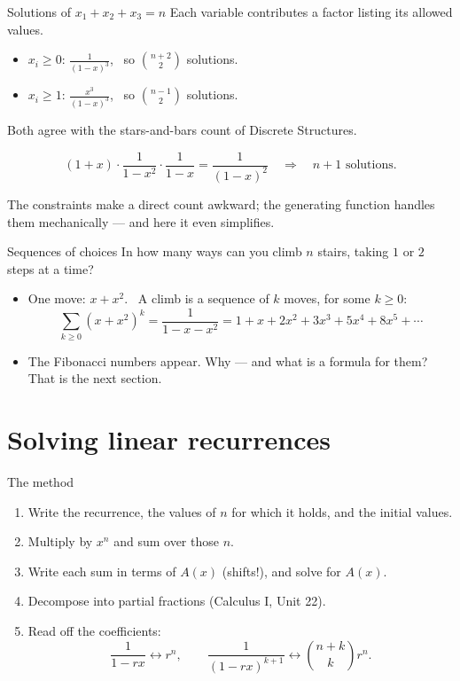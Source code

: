 \documentclass{wosm-slides}
\begin{document}
\begin{frame}{Solutions of $x_1 + x_2 + x_3 = n$}
  Each variable contributes a factor listing its allowed values.
  \begin{itemize}
    \item $x_i \ge 0$: \quad $\frac{1}{(1-x)^3}$, \ so $\binom{n+2}{2}$ solutions.
    \item $x_i \ge 1$: \quad $\frac{x^3}{(1-x)^3}$, \ so $\binom{n-1}{2}$ solutions.
  \end{itemize}
  Both agree with the stars-and-bars count of Discrete Structures.
  \pause
  \begin{example}[$x_1 \in \{0, 1\}$, \ $x_2$ even, \ $x_3 \ge 0$]
    \[ (1 + x) \cdot \frac{1}{1 - x^2} \cdot \frac{1}{1 - x} = \frac{1}{(1-x)^2}
       \quad\Longrightarrow\quad n + 1 \text{ solutions.} \]
  \end{example}
  {\small The constraints make a direct count awkward; the generating function handles them
  mechanically --- and here it even simplifies.\par}
\end{frame}

\begin{frame}{Sequences of choices}
  In how many ways can you climb $n$ stairs, taking $1$ or $2$ steps at a time?
  \pause
  \begin{itemize}
    \item One move: $x + x^2$. \ A climb is a sequence of $k$ moves, for some $k \ge 0$:
      \[ \sum_{k \ge 0} (x + x^2)^k = \frac{1}{1 - x - x^2} = 1 + x + 2x^2 + 3x^3 + 5x^4 + 8x^5 + \cdots \]
    \item The Fibonacci numbers appear. Why --- and what is a formula for them?
      That is the next section.
  \end{itemize}
\end{frame}

\section{Solving linear recurrences}

\begin{frame}{The method}
  \begin{enumerate}
    \item Write the recurrence, the values of $n$ for which it holds, and the initial values.
    \item Multiply by $x^n$ and sum over those $n$.
    \item Write each sum in terms of $A(x)$ (shifts!), and solve for $A(x)$.
    \item Decompose into partial fractions (Calculus I, Unit 22).
    \item Read off the coefficients:
      \[ \frac{1}{1 - rx} \leftrightarrow r^n, \qquad
         \frac{1}{(1 - rx)^{k+1}} \leftrightarrow \binom{n + k}{k} r^n . \]
  \end{enumerate}
\end{frame}
\end{document}
